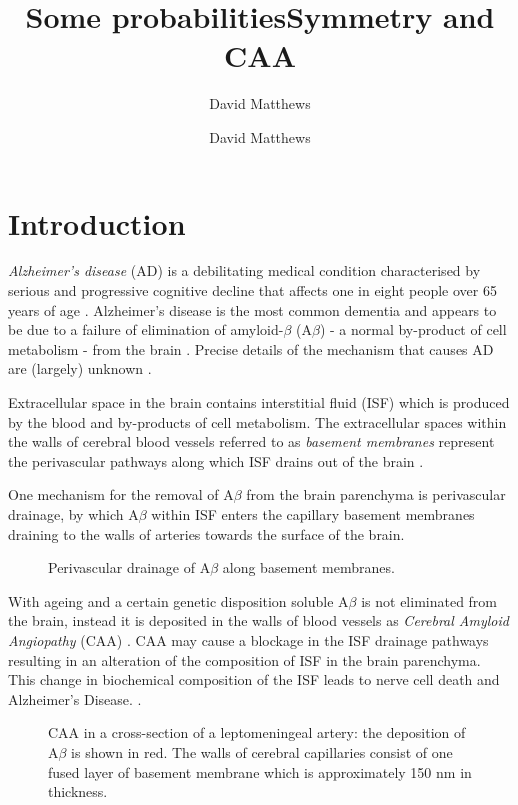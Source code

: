 \documentclass[10pt]{amsart} %
\title{Some probabilities}
\author{David Matthews}
\theoremstyle{definition}
\begin{document}
\title{Symmetry and CAA}
\author{David Matthews}

\section{Introduction}\label{sec:intro}
\emph{Alzheimer's disease} (AD) is a debilitating medical condition characterised by serious and progressive cognitive decline that affects one in eight people over 65 years of age \cite{Bengt}. Alzheimer's disease is the most common dementia and appears to be due to a failure of elimination of amyloid-$\beta$ (A$\beta$) - a normal by-product of cell metabolism 
- from the brain \cite{wellermicro}. Precise details of the mechanism that causes AD are (largely) unknown  \cite{wellerperi}. 

Extracellular space in the brain contains interstitial fluid (ISF) which is produced by the blood and by-products of cell metabolism.  The extracellular spaces within the walls of cerebral blood vessels referred to as \emph{basement membranes} represent the perivascular pathways along which ISF drains out of the brain \cite{wellerperi,wellermicro,Rox}.  

One mechanism for the removal of A$\beta$ from the brain parenchyma is perivascular drainage, by which A$\beta$ within ISF enters the capillary basement membranes draining to the walls of arteries towards the surface of the brain. 

\begin{figure}[h]

              \centering
                \caption{Perivascular drainage of A$\beta$ along basement membranes.}\label{fig:1}
\end{figure}

With ageing and a certain genetic disposition soluble A$\beta$ is not eliminated from the brain, instead it is deposited in the walls of blood vessels as \emph{Cerebral Amyloid Angiopathy} (CAA) \cite{Rox,;wellerperi}. CAA may cause a blockage in the ISF drainage pathways resulting in an alteration of the composition of ISF in the brain parenchyma. This change in biochemical composition of the ISF leads to nerve cell death and Alzheimer's Disease. \cite{Rox}.   

\begin{figure}[h]

              \centering
                \caption{CAA in a cross-section of a leptomeningeal artery: the deposition of A$\beta$ is shown in red.  The walls of cerebral capillaries consist of one fused layer of basement membrane which is approximately 150 nm in thickness.}\label{figy:2}
\end{figure}
\end{document}
